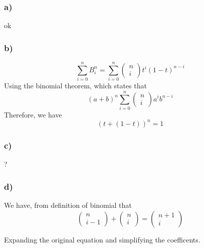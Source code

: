 \subsubsection{a) }
ok 

\subsubsection{b)}
\[
    \sum_{i=0}^{n} B _{ i }^{ n } = \sum_{i=0}^{n} 
    \begin{pmatrix*}
        n \\
        i 
    \end{pmatrix*}
    t^i\left( 1 - t\right) ^{n-i} 
\]
Using the binomial theorem, which states that 
\[
    \left( a+b\right) ^n
\sum_{i=0}^{n} \begin{pmatrix*}
    n \\
    i 
\end{pmatrix*}
a^ib^{n-i} 
\] 
Therefore, we have 
\[
\left( t + \left( 1 - t\right) \right) ^n = 1
\]


\subsubsection{c)}
?


\subsubsection{d)}
We have, from definition of binomial that 
\[
\begin{pmatrix*}
     n \\
     i-1
\end{pmatrix*}
+ 
\begin{pmatrix*}
     n \\
     i
\end{pmatrix*}
=
\begin{pmatrix*}
    n+1  \\
    i  
\end{pmatrix*}
\]

Expanding the original equation and simplifying the coefficents. 

